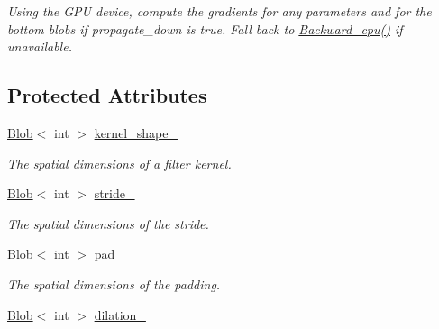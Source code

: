 \begin{DoxyCompactItemize}
\begin{DoxyCompactList}\small\item\em Using the G\+PU device, compute the gradients for any parameters and for the bottom blobs if propagate\+\_\+down is true. Fall back to \hyperlink{classcaffe_1_1Im2colLayer_a3b2dc21acbbe2e174cc83554469c29f5}{Backward\+\_\+cpu()} if unavailable. \end{DoxyCompactList}\end{DoxyCompactItemize}
\subsection*{Protected Attributes}
\begin{DoxyCompactItemize}
\item 
\hyperlink{classcaffe_1_1Blob}{Blob}$<$ int $>$ \hyperlink{classcaffe_1_1Im2colLayer_a188e9ea1225c7f373f4d50e2a78dcec7}{kernel\+\_\+shape\+\_\+}\hypertarget{classcaffe_1_1Im2colLayer_a188e9ea1225c7f373f4d50e2a78dcec7}{}\label{classcaffe_1_1Im2colLayer_a188e9ea1225c7f373f4d50e2a78dcec7}

\begin{DoxyCompactList}\small\item\em The spatial dimensions of a filter kernel. \end{DoxyCompactList}\item 
\hyperlink{classcaffe_1_1Blob}{Blob}$<$ int $>$ \hyperlink{classcaffe_1_1Im2colLayer_afb9baa8216b65a8124d4d1d2b719da0f}{stride\+\_\+}\hypertarget{classcaffe_1_1Im2colLayer_afb9baa8216b65a8124d4d1d2b719da0f}{}\label{classcaffe_1_1Im2colLayer_afb9baa8216b65a8124d4d1d2b719da0f}

\begin{DoxyCompactList}\small\item\em The spatial dimensions of the stride. \end{DoxyCompactList}\item 
\hyperlink{classcaffe_1_1Blob}{Blob}$<$ int $>$ \hyperlink{classcaffe_1_1Im2colLayer_a55c335fac2a25ba438a8bf94497c53ec}{pad\+\_\+}\hypertarget{classcaffe_1_1Im2colLayer_a55c335fac2a25ba438a8bf94497c53ec}{}\label{classcaffe_1_1Im2colLayer_a55c335fac2a25ba438a8bf94497c53ec}

\begin{DoxyCompactList}\small\item\em The spatial dimensions of the padding. \end{DoxyCompactList}\item 
\hyperlink{classcaffe_1_1Blob}{Blob}$<$ int $>$ \hyperlink{classcaffe_1_1Im2colLayer_a3420f6068a4befb3b0ed1ffe5ff0e84c}{dilation\+\_\+}\hypertarget{classcaffe_1_1Im2colLayer_a3420f6068a4befb3b0ed1ffe5ff0e84c}{}\label{classcaffe_1_1Im2colLayer_a3420f6068a4befb3b0ed1ffe5ff0e84c}


\end{DoxyCompactItemize}
